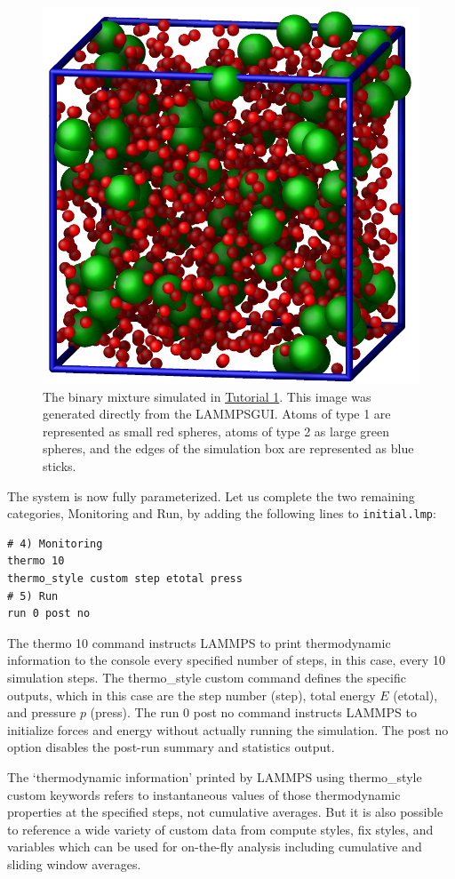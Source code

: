 \documentclass[9pt,tutorial]{livecoms}
\newcommand{\lmpcmd}[1]{\colorbox{listing}{\textcolor{command}{\small{#1}}}} %
\newcommand{\flecmd}[1]{\textcolor{command}{\texttt{#1}}} %
\newcommand{\lammpsgui}{\textsf{LAMMPS\textendash GUI}}
\begin{document}
\begin{figure}
\centering
\includegraphics[width=0.55\linewidth]{LJ}
\caption{The binary mixture simulated in \hyperref[lennard-jones-label]{Tutorial 1}.
  This image was generated directly from the \lammpsgui{}.  Atoms of
  type 1 are represented as small red spheres, atoms of type 2 as large
  green spheres, and the edges of the simulation box are represented as blue sticks.}
\label{fig:LJ}
\end{figure}

The system is now fully parameterized.  Let us complete the two remaining categories,
\lmpcmd{Monitoring} and \lmpcmd{Run}, by adding the following lines
to \flecmd{initial.lmp}:
\begin{lstlisting}
# 4) Monitoring
thermo 10
thermo_style custom step etotal press
# 5) Run
run 0 post no
\end{lstlisting}
The \lmpcmd{thermo 10} command instructs LAMMPS to print thermodynamic
information to the console every specified number of steps, in this case,
every 10 simulation steps.  The \lmpcmd{thermo\_style custom} command
defines the specific outputs, which in this case are the step number
(\lmpcmd{step}), total energy $E$ (\lmpcmd{etotal}), and pressure $p$ (\lmpcmd{press}).
The \lmpcmd{run 0 post no} command instructs LAMMPS to initialize forces and energy
without actually running the simulation.  The \lmpcmd{post no} option disables
the post-run summary and statistics output.

\begin{note} {\color{blue}The `thermodynamic information' printed by
    LAMMPS using \lmpcmd{thermo\_style custom} keywords refers to
    instantaneous values of those thermodynamic properties at the
    specified steps, not cumulative averages.  But it is also possible
    to reference a wide variety of custom data from compute styles, fix
    styles, and variables which can be used for on-the-fly analysis
    including cumulative and sliding window averages.}
\end{note}
\end{document}
